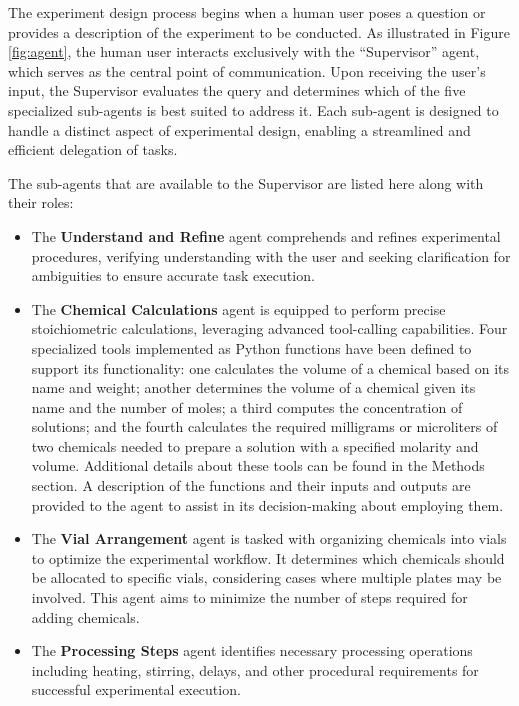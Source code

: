 \documentclass[sn-nature, twocolumn]{sn-jnl}%
\theoremstyle{thmstyleone}%
\theoremstyle{thmstyletwo}%
\theoremstyle{thmstylethree}%
\begin{document}
The experiment design process begins when a human user poses a question or provides a description of the experiment to be conducted. As illustrated in Figure \ref{fig:agent}, the human user interacts exclusively with the ``Supervisor'' agent, which serves as the central point of communication. Upon receiving the user’s input, the Supervisor evaluates the query and determines which of the five specialized sub-agents is best suited to address it. Each sub-agent is designed to handle a distinct aspect of experimental design, enabling a streamlined and efficient delegation of tasks.

The sub-agents that are available to the Supervisor are listed here along with their roles:

\begin{itemize}
\item The \textbf{Understand and Refine} agent comprehends and refines experimental procedures, verifying understanding with the user and seeking clarification for ambiguities to ensure accurate task execution. 

\item The \textbf{Chemical Calculations} agent is equipped to perform precise stoichiometric calculations, leveraging advanced tool-calling capabilities. Four specialized tools implemented as Python functions have been defined to support its functionality: one calculates the volume of a chemical based on its name and weight; another determines the volume of a chemical given its name and the number of moles; a third computes the concentration of solutions; and the fourth calculates the required milligrams or microliters of two chemicals needed to prepare a solution with a specified molarity and volume. Additional details about these tools can be found in the Methods section. A description of the functions and their inputs and outputs are provided to the agent to assist in its decision-making about employing them.

\item The \textbf{Vial Arrangement} agent is tasked with organizing chemicals into vials to optimize the experimental workflow. It determines which chemicals should be allocated to specific vials, considering cases where multiple plates may be involved. This agent aims to minimize the number of steps required for adding chemicals.

\item The \textbf{Processing Steps} agent identifies necessary processing operations including heating, stirring, delays, and other procedural requirements for successful experimental execution. 


\end{itemize}
\end{document}
